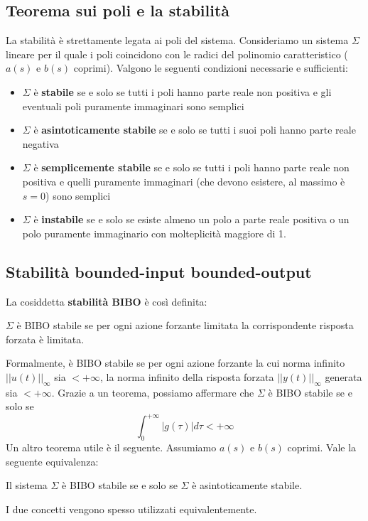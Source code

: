 \documentclass[11pt]{article}
\begin{document}
\subsection{Teorema sui poli e la stabilità}
La stabilità è strettamente legata ai poli del sistema. Consideriamo un sistema $\Sigma$ lineare per il quale i poli coincidono con le radici del polinomio caratteristico ($a(s)$ e $b(s)$ coprimi). Valgono le seguenti condizioni necessarie e sufficienti:
\begin{itemize}
    \item $\Sigma$ è \textbf{stabile} se e solo se tutti i poli hanno parte reale non positiva e gli eventuali poli puramente immaginari sono semplici
    \item $\Sigma$ è \textbf{asintoticamente stabile} se e solo se tutti i suoi poli hanno parte reale negativa
    \item $\Sigma$ è \textbf{semplicemente stabile} se e solo se tutti i poli hanno parte reale non positiva e quelli puramente immaginari (che devono esistere, al massimo è $s=0$) sono semplici
    \item $\Sigma$ è \textbf{instabile} se e solo se esiste almeno un polo a parte reale positiva o un polo puramente immaginario con molteplicità maggiore di 1.
\end{itemize}
\subsection{Stabilità bounded-input bounded-output}
La cosiddetta \textbf{stabilità BIBO} è così definita:
\begin{center}
    $\Sigma$ è BIBO stabile se per ogni azione forzante limitata la corrispondente risposta forzata è limitata.
\end{center}
Formalmente, è BIBO stabile se per ogni azione forzante la cui norma infinito $||u(t)||_\infty$ sia $<+\infty$, la norma infinito della risposta forzata $||y(t)||_\infty$ generata sia $<+\infty$.
Grazie a un teorema, possiamo affermare che $\Sigma$ è BIBO stabile se e solo se
\begin{displaymath}
    \int_0^{+\infty} |g(\tau)|d\tau < +\infty
\end{displaymath}
Un altro teorema utile è il seguente. Assumiamo $a(s)$ e $b(s)$ coprimi. Vale la seguente equivalenza:
\begin{center}
    Il sistema $\Sigma$ è BIBO stabile se e solo se $\Sigma$ è asintoticamente stabile.
\end{center}
I due concetti vengono spesso utilizzati equivalentemente.
\end{document}
